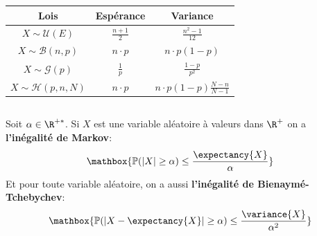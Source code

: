 \begin{center}
   \renewcommand{\arraystretch}{2}
   \setlength{\tabcolsep}{18pt}
   
   \begin{tabular}{|c||c|c|}
      \hline
      Lois & \cellcolor{BrightBlue1!40} Espérance & \cellcolor{BrightBlue1!40} Variance \\ 
      \hline
      \cellcolor{BrightBlue1!40} \(X \sim \mathcal{U}(E)\) & \(\frac{n+1}{2}\) & \(\frac{n^2 - 1}{12}\) \\ 
      \hline
      \cellcolor{BrightBlue1!40} \(X \sim \mathcal{B}(n, p)\) & \(n\cdot p\) &  \(n\cdot p(1-p)\) \\ 
      \hline
      \cellcolor{BrightBlue1!40} \(X \sim \mathcal{G}(p)\) & \(\frac{1}{p}\) & \(\frac{1-p}{p^2}\) \\ 
      \hline
      \cellcolor{BrightBlue1!40} \(X \sim \mathcal{H}(p, n, N)\) & \(n\cdot p\) & \(n\cdot p(1-p)\frac{N - n}{N - 1}\) \\ 
      \hline
   \end{tabular}
\end{center}

\subsection*{}
Soit \(\alpha \in \R^{+*}\).\+
Si \(X\) est une variable aléatoire à valeurs dans \(\R^+\) on a \textbf{l'inégalité de Markov}:
\[
   \mathbox{
      \mathbb{P}(|X| \geq \alpha) \leq \frac{\expectancy{X}}{\alpha}
   }
\]
Et pour toute variable aléatoire, on a aussi \textbf{l'inégalité de Bienaymé-Tchebychev}:
\[
   \mathbox{
      \mathbb{P}(|X - \expectancy{X}| \geq \alpha) \leq \frac{\variance{X}}{\alpha^2}
   }
\]
